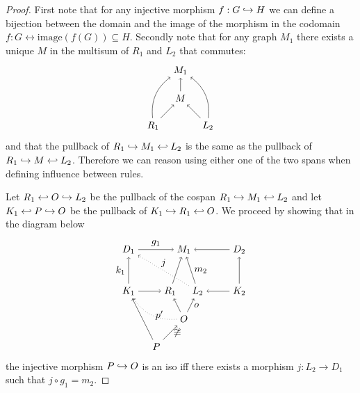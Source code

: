 \begin{proof}
  First note that for any injective morphism $f:G\hookrightarrow H$ we can define a bijection between the domain and the image of the morphism in the codomain $f:G\leftrightarrow \text{image}(f(G))\subseteq H$. Secondly note that for any graph $M_1$ there exists a unique $M$ in the multisum of $R_1$ and $L_2$ that commutes:
  \[
  \begin{tikzpicture} %
    \node (r1) at (1,0) {\(R_1\)};
    \node (m1) at (2,2) {\(M_1\)};
    \node (m) at (2,1) {\(M\)};
    \node (l2) at (3,0) {\(L_2\)};
    \draw [->] (r1) -- (m);
    \draw [->] (l2) -- (m);
    \draw [->] (m) -- (m1);
    \draw [->] (r1) to [bend left] (m1);
    \draw [->] (l2) to [bend right] (m1);
    \end{tikzpicture}
    \]
    and that the pullback of $R_1\hookrightarrow M_1\hookleftarrow L_2$ is the same as the pullback of $R_1\hookrightarrow M\hookleftarrow L_2$. Therefore we can reason using either one of the two spans when defining influence between rules.

    Let $R_1\hookleftarrow O \hookrightarrow L_2$ be the pullback of the cospan $R_1\hookrightarrow M_1\hookleftarrow L_2$ and let $K_1\hookleftarrow P \hookrightarrow O$ be the pullback of $K_1\hookrightarrow R_1\hookleftarrow O$.
  We proceed by showing that in the diagram below
    \[
    \begin{tikzpicture} %
    \node (r1) at (1.5,0) {\(R_1\)};
    \node (m1) at (2,1.5) {\(M_1\)};
    \node (l2) at (2.5,0) {\(L_2\)};
    \node (d1) at (0,1.5) {\(D_1\)};
    \node (k1) at (0,0) {\(K_1\)};
    \node (d2) at (4,1.5) {\(D_2\)};
    \node (k2) at (4,0) {\(K_2\)};
    \node (o) at (2,-1) {\(O\)};
    \node (p) at (1,-2) {\(P\)};
    \draw [->] (k1) -- (r1);
    \draw [->] (k2) -- (l2);
    \draw [->] (k1) -- node [left,midway] {\(k_1\)} (d1);
    \draw [->] (k2) -- (d2);
    \draw [->] (d1) -- node [above,midway] {\(g_1\)} (m1);
    \draw [->] (d2) -- (m1);
    \draw [->] (l2) -- node [right,midway] {\(m_2\)} (m1);
    \draw [->] (r1) -- (m1);
    \draw [dotted,->] (l2) -- node [above,midway] {\(j\)} (d1);
    \draw [->] (p) -- (k1);
    \draw [->] (p) -- node [right,midway] {$\not\iso$} (o);
    \draw [->] (o) -- (r1);
    \draw [->] (o) -- node [right,midway] {$o$} (l2);
    \draw [dotted,->] (o) to [bend left] node [right,midway] {$p'$} (k1);
    \end{tikzpicture}
    \]
    the injective morphism $P\hookrightarrow O$ is an iso iff there exists a morphism $j:L_2\to D_1$ such that $j\circ g_1 = m_2$.


\end{proof}
